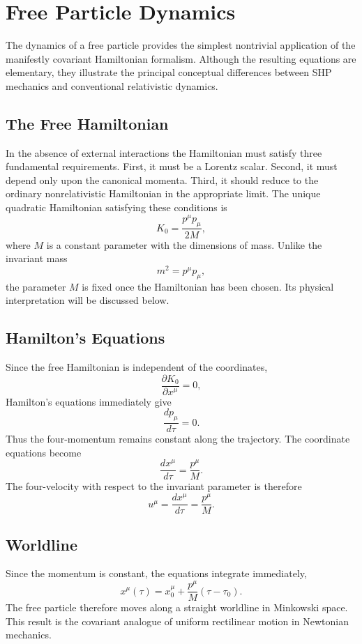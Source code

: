 \section{Free Particle Dynamics}
The dynamics of a free particle provides the simplest nontrivial
application of the manifestly covariant Hamiltonian formalism.
Although the resulting equations are elementary, they illustrate the
principal conceptual differences between SHP mechanics and conventional
relativistic dynamics.
\subsection{The Free Hamiltonian}
In the absence of external interactions the Hamiltonian must satisfy
three fundamental requirements.
First, it must be a Lorentz scalar.
Second, it must depend only upon the canonical momenta.
Third, it should reduce to the ordinary nonrelativistic Hamiltonian in
the appropriate limit.
The unique quadratic Hamiltonian satisfying these conditions is
\[\boxed{K_0=\frac{p^\mu p_\mu}{2M},}\]
where \(M\) is a constant parameter with the dimensions of mass.
Unlike the invariant mass
\[m^2=p^\mu p_\mu,\]
the parameter \(M\) is fixed once the Hamiltonian has been chosen.
Its physical interpretation will be discussed below.
\subsection{Hamilton's Equations}
Since the free Hamiltonian is independent of the coordinates,
\[\frac{\partial K_0}{\partial x^\mu}=0,\]
Hamilton's equations immediately give
\[\boxed{\frac{dp_\mu}{d\tau}=0.}\]
Thus the four-momentum remains constant along the trajectory.
The coordinate equations become
\[\boxed{\frac{dx^\mu}{d\tau}=\frac{p^\mu}{M}.}\]
The four-velocity with respect to the invariant parameter is therefore
\[u^\mu=\frac{dx^\mu}{d\tau}=\frac{p^\mu}{M}.\]
\subsection{Worldline}
Since the momentum is constant, the equations integrate immediately,
\[\boxed{x^\mu(\tau)=x^\mu_0+\frac{p^\mu}{M}(\tau-\tau_0).}\]
The free particle therefore moves along a straight worldline in
Minkowski space.
This result is the covariant analogue of uniform rectilinear motion in
Newtonian mechanics.

